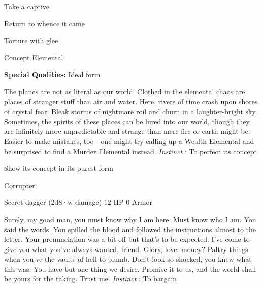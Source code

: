 \startitemize[1,packed]
         
\item Take a captive

         
\item Return to whence it came

         
\item Torture with glee

       
\stopitemize
       
\startMonsterName
Concept Elemental	 
\stopMonsterName
       
\startMonsterQualities
         {\bf Special Qualities:}  Ideal form
\stopMonsterQualities
       
\startMonsterDescription
The planes are not as literal as our world. Clothed in the elemental chaos are places of stranger stuff than air and water. Here, rivers of time crash upon shores of crystal fear. Bleak storms of nightmare roil and churn in a laughter-bright sky. Sometimes, the spirits of these places can be lured into our world, though they are infinitely more unpredictable and strange than mere fire or earth might be. Easier to make mistakes, too—one might try calling up a Wealth Elemental and be surprised to find a Murder Elemental instead. {\em Instinct} : To perfect its concept
\stopMonsterDescription
       
\startitemize[1,packed]
         
\item Show its concept in its purest form

       
\stopitemize
       
\startMonsterName
Corrupter	 
\stopMonsterName
       

Secret dagger (2d8·w damage)	12 HP	0 Armor

       


       
\startMonsterDescription
Surely, my good man, you must know why I am here. Must know who I am. You said the words. You spilled the blood and followed the instructions almost to the letter. Your pronunciation was a bit off but that’s to be expected. I’ve come to give you what you’ve always wanted, friend. Glory, love, money? Paltry things when you’ve the vaults of hell to plumb. Don’t look so shocked, you knew what this was. You have but one thing we desire. Promise it to us, and the world shall be yours for the taking. Trust me. {\em Instinct} : To bargain
\stopMonsterDescription
       

